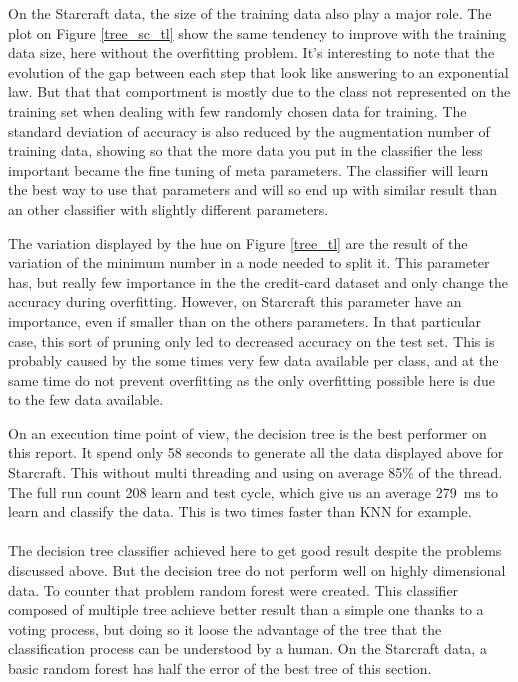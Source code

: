 \documentclass[twocolumn,a4paper,10pt]{article}
\begin{document}
On the Starcraft data, the size of the training data also play a major role. The plot on Figure \ref{tree_sc_tl} show the same tendency to improve with the training data size, here without the overfitting problem. It's interesting to note that the evolution of the gap between each step that look like answering to an exponential law. But that that comportment is mostly due to the class not represented on the training set when dealing with few randomly chosen data for training. The standard deviation of accuracy is also reduced by the augmentation number of training data, showing so that the more data you put in the classifier the less important became the fine tuning of meta parameters. The classifier will learn the best way to use that parameters and will so end up with similar result than an other classifier with slightly different parameters.

The variation displayed by the hue on Figure \ref{tree_tl} are the result of the variation of the minimum number in a node needed to split it. This parameter has, but really few importance in the the credit-card dataset and only change the accuracy during overfitting. However, on Starcraft this parameter have an importance, even if smaller than on the others parameters. In that particular case, this sort of pruning only led to decreased accuracy on the test set. This is probably caused by the some times very few data available per class, and at the same time do not prevent overfitting as the only overfitting possible here is due to the few data available.

On an execution time point of view, the decision tree is the best performer on this report. It spend only 58 seconds to generate all the data displayed above for Starcraft. This without multi threading and using on average 85\% of the thread. The full run count 208 learn and test cycle, which give us an average 279~ms to learn and classify the data. This is two times faster than KNN for example.


\paragraph{}
The decision tree classifier achieved here to get good result despite the problems discussed above. But the decision tree do not perform well on highly dimensional data. To counter that problem random forest were created. This classifier composed of multiple tree achieve better result than a simple one thanks to a voting process, but doing so it loose the advantage of the tree that the classification process can be understood by a human. On the Starcraft data, a basic random forest has half the error of the best tree of this section.
\end{document}
